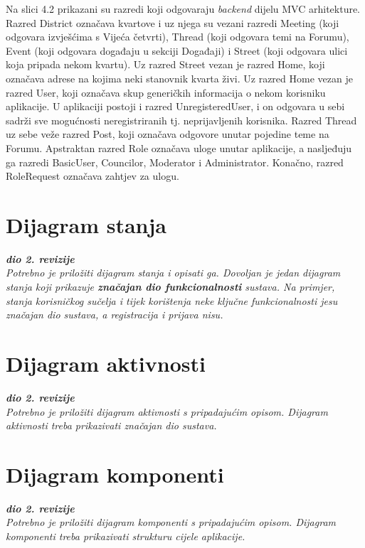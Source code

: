 			Na slici 4.2 prikazani su razredi koji odgovaraju \textit{backend} dijelu MVC arhitekture. Razred District označava kvartove i uz njega su vezani razredi Meeting (koji odgovara izvješćima s Vijeća četvrti), Thread (koji odgovara temi na Forumu), Event (koji odgovara događaju u sekciji Događaji) i Street (koji odgovara ulici koja pripada nekom kvartu). Uz razred Street vezan je razred Home, koji označava adrese na kojima neki stanovnik kvarta živi. Uz razred Home vezan je razred User, koji označava skup generičkih informacija o nekom korisniku aplikacije. U aplikaciji postoji i razred UnregisteredUser, i on odgovara u sebi sadrži sve mogućnosti neregistriranih tj. neprijavljenih korisnika. Razred Thread uz sebe veže razred Post, koji označava odgovore unutar pojedine teme na Forumu. Apstraktan razred Role označava uloge unutar aplikacije, a nasljeđuju ga razredi BasicUser, Councilor, Moderator i Administrator. Konačno, razred RoleRequest označava zahtjev za ulogu.
		
		\section{Dijagram stanja}
			
			
			\textbf{\textit{dio 2. revizije}}\\
			
			\textit{Potrebno je priložiti dijagram stanja i opisati ga. Dovoljan je jedan dijagram stanja koji prikazuje \textbf{značajan dio funkcionalnosti} sustava. Na primjer, stanja korisničkog sučelja i tijek korištenja neke ključne funkcionalnosti jesu značajan dio sustava, a registracija i prijava nisu. }
			
			
			\eject 
		
		\section{Dijagram aktivnosti}
			
			\textbf{\textit{dio 2. revizije}}\\
			
			 \textit{Potrebno je priložiti dijagram aktivnosti s pripadajućim opisom. Dijagram aktivnosti treba prikazivati značajan dio sustava.}
			
			\eject
		\section{Dijagram komponenti}
		
			\textbf{\textit{dio 2. revizije}}\\
		
			 \textit{Potrebno je priložiti dijagram komponenti s pripadajućim opisom. Dijagram komponenti treba prikazivati strukturu cijele aplikacije.}
